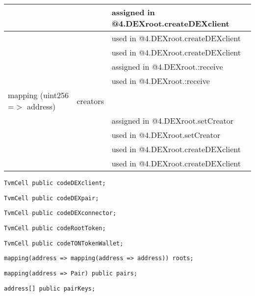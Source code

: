 \begin{tabular}{|l|l|p{5cm}|}
 & & assigned in @4.DEXroot.createDEXclient\\\hline
 & & used in @4.DEXroot.createDEXclient\\\hline
 & & used in @4.DEXroot.createDEXclient\\\hline
 & & assigned in @4.DEXroot.:receive\\\hline
 & & used in @4.DEXroot.:receive\\\hline
mapping (uint256 =$>$ address) & creators &  \\\hline
 & & assigned in @4.DEXroot.setCreator\\\hline
 & & used in @4.DEXroot.setCreator\\\hline
 & & used in @4.DEXroot.createDEXclient\\\hline
 & & used in @4.DEXroot.createDEXclient\\\hline
\end{tabular}
\fi


\begin{lstlisting}[firstnumber=15]
	TvmCell public codeDEXclient;
\end{lstlisting}

\begin{lstlisting}[firstnumber=16]
	TvmCell public codeDEXpair;
\end{lstlisting}

\begin{lstlisting}[firstnumber=17]
	TvmCell public codeDEXconnector;
\end{lstlisting}

\begin{lstlisting}[firstnumber=18]
	TvmCell public codeRootToken;
\end{lstlisting}

\begin{lstlisting}[firstnumber=19]
	TvmCell public codeTONTokenWallet;
\end{lstlisting}

\begin{lstlisting}[firstnumber=21]
	mapping(address => mapping(address => address)) roots;
\end{lstlisting}

\begin{lstlisting}[firstnumber=30]
	mapping(address => Pair) public pairs;
\end{lstlisting}

\begin{lstlisting}[firstnumber=31]
	address[] public pairKeys;
\end{lstlisting}

